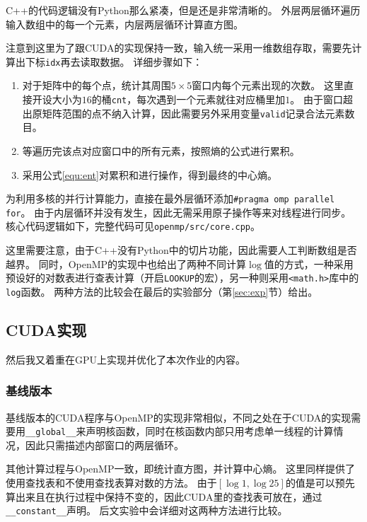 \documentclass[logo,reportComp]{thesis}
\def\sharedmem{\textcolor{red}{\kaiti 共享内存}}
\def\constmem{\textcolor{blue}{\kaiti 常量内存}}
\begin{document}
C++的代码逻辑没有Python那么紧凑，但是还是非常清晰的。
外层两层循环遍历输入数组中的每一个元素，内层两层循环计算直方图。

注意到这里为了跟CUDA的实现保持一致，输入统一采用一维数组存取，需要先计算出下标\verb'idx'再去读取数据。
详细步骤如下：
\begin{enumerate}
\item 对于矩阵中的每个点，统计其周围$5\times 5$窗口内每个元素出现的次数。
这里直接开设大小为$16$的桶\verb'cnt'，每次遇到一个元素就往对应桶里加$1$。
由于窗口超出原矩阵范围的点不纳入计算，因此需要另外采用变量\verb'valid'记录合法元素数目。
\item 等遍历完该点对应窗口中的所有元素，按照熵的公式进行累积。
\item 采用公式\ref{equ:ent}对累积和进行操作，得到最终的中心熵。
\end{enumerate}

为利用多核的并行计算能力，直接在最外层循环添加\verb'#pragma omp parallel for'。
由于内层循环并没有发生，因此无需采用原子操作等来对线程进行同步。
核心代码逻辑如下，完整代码可见\verb'openmp/src/core.cpp'。



这里需要注意，由于C++没有Python中的切片功能，因此需要人工判断数组是否越界。
同时，OpenMP的实现中也给出了两种不同计算$\log$值的方式，一种采用预设好的对数表进行查表计算（开启\verb'LOOKUP'的宏），另一种则采用\verb'<math.h>'库中的\verb'log'函数。
两种方法的比较会在最后的实验部分（第\ref{sec:exp}节）给出。

\subsection{CUDA实现}
\label{sub:cuda}
然后我又着重在GPU上实现并优化了本次作业的内容。

\subsubsection{基线版本}
基线版本的CUDA程序与OpenMP的实现非常相似，不同之处在于CUDA的实现需要用\verb'__global__'来声明核函数，同时在核函数内部只用考虑单一线程的计算情况，因此只需描述内部窗口的两层循环。

其他计算过程与OpenMP一致，即统计直方图，并计算中心熵。
这里同样提供了使用查找表和不使用查找表算对数的方法。
由于$[\log1,\log25]$的值是可以预先算出来且在执行过程中保持不变的，因此CUDA里的查找表可放在，通过\verb'__constant__'声明。
后文实验中会详细对这两种方法进行比较。
\end{document}
